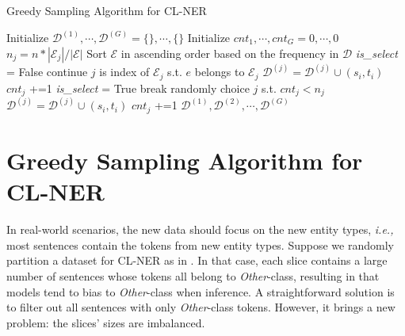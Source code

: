 \documentclass[11pt]{article}
\begin{document}
\begin{algorithm}[!t] 
\caption{Greedy Sampling Algorithm for CL-NER} \label{greedy_sampling}
Initialize $\mathcal{D}^{(1)},\cdots,\mathcal{D}^{(G)}=\{\},\cdots,\{\}$\;
Initialize $cnt_1,\cdots,cnt_G=0,\cdots,0$\;
{
 $n_j = n*|\mathcal{E}_j|/|\mathcal{E}|$
}
Sort $\mathcal{E}$ in ascending order based on the frequency in $\mathcal{D}$\;
{
    \textit{is\_select} = False\;
    {
        {
            continue\;
        }
        $j$ is index of $\mathcal{E}_j$ s.t. $e$ belongs to $\mathcal{E}_j$\;
        {
            $\mathcal{D}^{(j)}=\mathcal{D}^{(j)}\cup{(s_i,t_i)}$\;
            $cnt_j$ +=1\;
            \textit{is\_select} = True\;
            break\;
        }
    }
    {
        randomly choice $j$ s.t. $cnt_j<n_j$\;
        $\mathcal{D}^{(j)}=\mathcal{D}^{(j)}\cup{(s_i,t_i)}$\;
        $cnt_j$ +=1\;
    }
}
\Return $\mathcal{D}^{(1)},\mathcal{D}^{(2)},\cdots,\mathcal{D}^{(G)}$\;
\end{algorithm}


\section{Greedy Sampling Algorithm for CL-NER\label{appendix:greedy_algorithm}}

In real-world scenarios, the new data should focus on the new entity types, \textit{i.e., } most sentences contain the tokens from new entity types.
Suppose we randomly partition a dataset for CL-NER as in \citet{monaikul2021continual}. 
In that case, each slice contains a large number of sentences whose tokens all belong to \textit{Other}-class, resulting in that models tend to bias to \textit{Other}-class when inference.
A straightforward solution is to filter out all sentences with only \textit{Other}-class tokens.
However, it brings a new problem: the slices' sizes are imbalanced.
\end{document}
